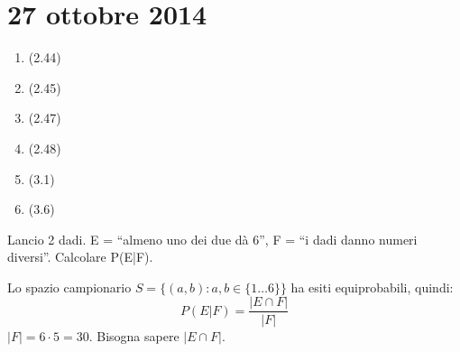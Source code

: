 \section{27 ottobre 2014}

\begin{enumerate}
    \item (2.44)
    \item (2.45)
    \item (2.47)
    \item (2.48)
    \item (3.1)
    \item (3.6)
\end{enumerate}

Lancio 2 dadi. E = ``almeno uno dei due d\`a 6'', F = ``i dadi danno numeri diversi''. Calcolare P(E|F).

Lo spazio campionario $S = \{(a, b) : a, b \in \{1 \dots 6\}\}$ ha esiti equiprobabili, quindi:
\[
P(E | F) = \frac{|E \cap F|}{|F|}
\]
$|F| = 6 \cdot 5 = 30$. Bisogna sapere $|E \cap F|$.

